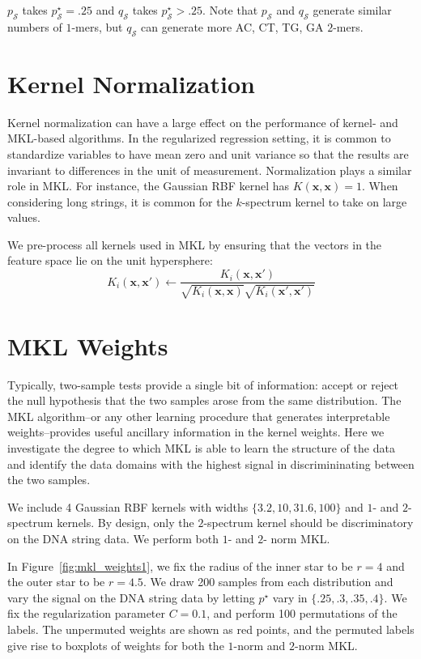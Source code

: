 $p_{\mathcal{S}}$ takes $p_{\mathcal{S}}^{\star} = .25$ and
$q_{\mathcal{S}}$ takes $p_{\mathcal{S}}^{\star} > .25$.  Note that
$p_{\mathcal{S}}$ and $q_{\mathcal{S}}$ generate similar numbers of
$1$-mers, but $q_{\mathcal{S}}$ can generate more AC, CT, TG, GA
$2$-mers.

\section{Kernel Normalization}
Kernel normalization can have a large effect on the performance of kernel- and MKL-based
algorithms.  In the regularized regression setting, it is common to standardize variables to have
mean zero and unit variance so that the results are invariant to differences in
the unit of measurement.  Normalization plays a similar role in MKL.  For instance,
the Gaussian RBF kernel has $K({\mathbf x}, {\mathbf x}) = 1$.  When considering long strings, it is
common for the $k$-spectrum kernel to take on large values.

We pre-process all kernels used in MKL by ensuring that the vectors in the feature
space lie on the unit hypersphere:
\begin{equation*}
  K_i({\mathbf x}, {\mathbf x}') \leftarrow \frac{K_i({\mathbf x}, {\mathbf x}')}{\sqrt{K_i({\mathbf x}, {\mathbf x})}\sqrt{K_i({\mathbf x}', {\mathbf x}')}}
\end{equation*}

\section{MKL Weights}
Typically, two-sample tests provide a single bit of information: accept or reject the null hypothesis
that the two samples arose from the same distribution.
The MKL algorithm--or any other learning procedure that generates interpretable
weights--provides useful ancillary information in the kernel weights.  Here we
investigate the degree to which MKL is able to learn the structure of the data
and identify the data domains with the highest signal in discrimininating between
the two samples.

We include 4 Gaussian RBF kernels with widths $\{3.2, 10, 31.6, 100\}$ and $1$- and
$2$-spectrum kernels.  By design, only the $2$-spectrum kernel should be discriminatory
on the DNA string data.  We perform both $1$- and $2$- norm MKL.

In Figure~\ref{fig:mkl_weights1}, we fix the radius of the inner star to be $r = 4$
and the outer star to be $r = 4.5$.  We draw 200 samples from each distribution and
vary the signal on the DNA string data by letting $p^{\star}$ vary in $\{.25, .3, .35, .4\}$.
We fix the regularization parameter $C = 0.1$, and perform 100 permutations of the labels.
The unpermuted weights are shown as red points, and the permuted labels give rise to
boxplots of weights for both the $1$-norm and $2$-norm MKL.

